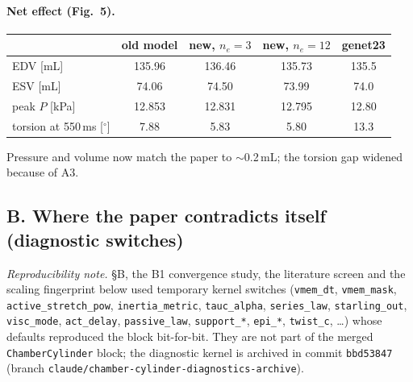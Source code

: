 \documentclass[10pt]{article}
\begin{document}
\paragraph{Net effect (Fig.~5).}
\begin{center}\begin{tabular}{lcccc}
\toprule & old model & new, $n_e{=}3$ & new, $n_e{=}12$ & genet23 \\ \midrule
EDV [mL] & 135.96 & 136.46 & 135.73 & 135.5 \\
ESV [mL] & 74.06 & 74.50 & 73.99 & 74.0 \\
peak $P$ [kPa] & 12.853 & 12.831 & 12.795 & 12.80 \\
torsion at 550\,ms [$^\circ$] & 7.88 & 5.83 & 5.80 & 13.3 \\ \bottomrule
\end{tabular}\end{center}
Pressure and volume now match the paper to $\sim$0.2\,mL; the torsion gap widened because of
A3.

\subsection*{B. Where the paper contradicts itself (diagnostic switches)}
\noindent\emph{Reproducibility note.} \S B, the B1 convergence study, the literature screen and
the scaling fingerprint below used temporary kernel switches (\texttt{vmem\_dt},
\texttt{vmem\_mask}, \texttt{active\_stretch\_pow}, \texttt{inertia\_metric},
\texttt{tauc\_alpha}, \texttt{series\_law}, \texttt{starling\_out}, \texttt{visc\_mode},
\texttt{act\_delay}, \texttt{passive\_law}, \texttt{support\_*}, \texttt{epi\_*},
\texttt{twist\_c}, \dots) whose defaults reproduced the block bit-for-bit. They are not part of
the merged \texttt{ChamberCylinder} block; the diagnostic kernel is archived in commit
\texttt{bbd53847} (branch \texttt{claude/chamber-cylinder-diagnostics-archive}).
\end{document}
